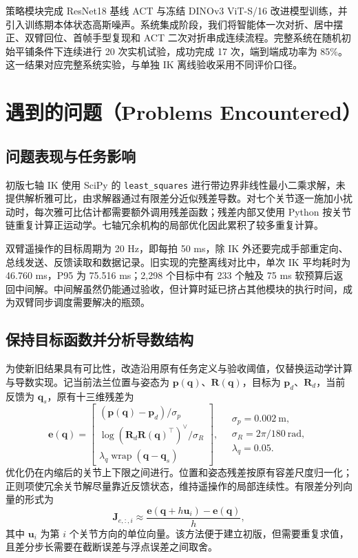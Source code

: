 \documentclass[UTF8,a4paper,zihao=-4]{ctexart}
\DeclareMathOperator{\wrap}{wrap}
\begin{document}
策略模块完成 ResNet18 基线 ACT 与冻结 DINOv3 ViT-S/16 改进模型训练，并引入训练期本体状态高斯噪声。系统集成阶段，我们将智能体一次对折、居中摆正、双臂回位、首帧手型复现和 ACT 二次对折串成连续流程。完整系统在随机初始平铺条件下连续进行 20 次实机试验，成功完成 17 次，端到端成功率为 85\%。这一结果对应完整系统实验，与单独 IK 离线验收采用不同评价口径。

\section{遇到的问题（Problems Encountered）}

\subsection{问题表现与任务影响}

初版七轴 IK 使用 SciPy 的 \texttt{least\_squares} 进行带边界非线性最小二乘求解，未提供解析雅可比，由求解器通过有限差分近似残差导数。对七个关节逐一施加小扰动时，每次雅可比估计都需要额外调用残差函数；残差内部又使用 Python 按关节链重复计算正运动学。七轴冗余机构的局部优化因此累积了较多重复计算。

双臂遥操作的目标周期为 20 Hz，即每拍 50 ms，除 IK 外还要完成手部重定向、总线发送、反馈读取和数据记录。旧实现的完整离线对比中，单次 IK 平均耗时为 46.760 ms，P95 为 75.516 ms；2,298 个目标中有 233 个触及 75 ms 软预算后返回中间解。中间解虽然仍能通过验收，但计算时延已挤占其他模块的执行时间，成为双臂同步调度需要解决的瓶颈。

\subsection{保持目标函数并分析导数结构}

为使新旧结果具有可比性，改造沿用原有任务定义与验收阈值，仅替换运动学计算与导数实现。记当前法兰位置与姿态为 $\bm p(\bm q)$、$\bm R(\bm q)$，目标为 $\bm p_d$、$\bm R_d$，当前反馈为 $\bm q_s$，原有十三维残差为
\begin{equation}
\bm e(\bm q)=
\begin{bmatrix}
(\bm p(\bm q)-\bm p_d)/\sigma_p\\[2pt]
\log(\bm R_d\bm R(\bm q)^\top)^\vee/\sigma_R\\[2pt]
\lambda_q\wrap(\bm q-\bm q_s)
\end{bmatrix},
\quad
\begin{gathered}
\sigma_p=0.002\ \mathrm m,\\
\sigma_R=2\pi/180\ \mathrm{rad},\\
\lambda_q=0.05.
\end{gathered}
\end{equation}
优化仍在内缩后的关节上下限之间进行。位置和姿态残差按原有容差尺度归一化；正则项使冗余关节解尽量靠近反馈状态，维持遥操作的局部连续性。有限差分列向量的形式为
\begin{equation}
\bm J_{e,:,i}\approx
\frac{\bm e(\bm q+h\bm u_i)-\bm e(\bm q)}{h},
\end{equation}
其中 $\bm u_i$ 为第 $i$ 个关节方向的单位向量。该方法便于建立初版，但需要重复求值，且差分步长需要在截断误差与浮点误差之间取舍。
\end{document}
